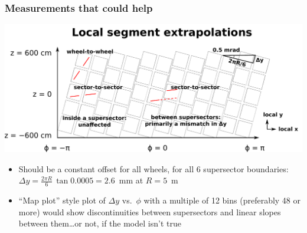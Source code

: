 \documentclass[compress]{beamer}
\begin{document}
\begin{frame}
\frametitle{Measurements that could help}
\includegraphics[width=\linewidth]{model2_local.pdf}

\begin{itemize}
\item Should be a constant offset for all wheels, for all 6
  supersector boundaries: $\displaystyle \Delta y = \frac{2\pi R}{6} \, \tan 0.0005
  = 2.6$~mm at $R=5$~m

\item ``Map plot'' style plot of $\Delta y$ vs.\ $\phi$ with a
  multiple of 12 bins (preferably 48 or more) would show
  discontinuities between supersectors and linear slopes between
  them\ldots or not, if the model isn't true
\end{itemize}
\end{frame}
\end{document}
